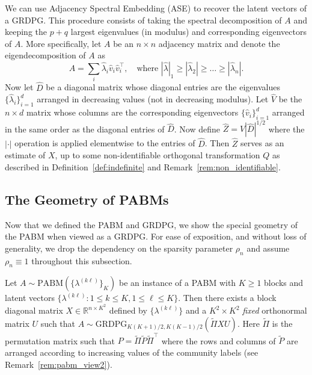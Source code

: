 \documentclass[12pt]{article}
\begin{document}
\begin{remark}
  \label{rem:ase}
We can use Adjacency Spectral Embedding (ASE) 
\citep{doi:10.1080/01621459.2012.699795} to recover the latent vectors of a GRDPG. 
This procedure consists of taking the spectral decomposition of $A$
and keeping the $p + q$ largest eigenvalues (in modulus) and
corresponding eigenvectors of $A$. More specifically, let $A$ be an $n
\times n$ adjacency matrix and denote the
eigendecomposition of $A$ as
$$A = \sum_{i} \hat{\lambda}_i \hat{v}_i \hat{v}_i^{\top}, \quad
\text{where} \,\,
|\hat{\lambda}|_1 \geq |\hat{\lambda}_2| \geq \dots \geq
|\hat{\lambda}_n|.$$
Now let $\hat{D}$ be a diagonal matrix whose diagonal entries are
the eigenvalues
$\{\hat{\lambda}_i\}_{i=1}^{d}$ arranged in decreasing values (not in
decreasing modulus). Let $\hat{V}$ be the $n \times d$ matrix whose
columns are the corresponding eigenvectors $\{\hat{v}_i\}_{i=1}^{d}$
arranged in the same order as the diagonal entries of $\hat{D}$. Now
define $\hat{Z} = \hat{V} |\hat{D}|^{1/2}$ where the $|\cdot|$
operation is applied elementwise to the entries of $\hat{D}$. Then
$\hat{Z}$ serves as an estimate of $X$, up to some non-identifiable
orthogonal transformation $Q$ as described in
Definition~\ref{def:indefinite} and
Remark~\ref{rem:non_identifiable}. 
\end{remark}

\hypertarget{connecting-the-pabm-to-the-grdpg}{%
\subsection{The Geometry of PABMs}\label{connecting-the-pabm-to-the-grdpg}}
Now that we defined the PABM and GRDPG, 
we show the special geometry of the PABM when viewed as a GRDPG. For
ease of exposition, and without loss of generality, we drop the
dependency on the sparsity parameter $\rho_n$ 
and assume $\rho_n \equiv 1$ throughout this subsection. 
\begin{theorem}
\label{theorem2}
Let $A \sim \mathrm{PABM}(\{\lambda^{(k \ell)}\}_K)$ be an instance of a
PABM with $K \geq 1$ blocks and latent vectors $\{\lambda^{(k \ell)}
\colon 1 \leq k \leq K, 1 \leq \ell \leq K\}$. 
Then there exists a block diagonal matrix
$X \in \mathbb{R}^{n \times K^2}$ defined by $\{\lambda^{(k \ell)}\}$ and a 
$K^2 \times K^2$ {\em fixed} orthonormal matrix $U$ such 
that $A \sim \mathrm{GRDPG}_{K (K+1) / 2, K (K-1) /
  2}(\tilde{\Pi}XU)$. Here $\tilde{\Pi}$ is the permutation matrix
such that $P = \tilde{\Pi} \tilde{P} \tilde{\Pi}^{\top}$ where the
rows and columns of $\tilde{P}$ are arranged according to increasing values of the
community labels (see Remark~\ref{rem:pabm_view2}). 
\end{theorem}
\end{document}
